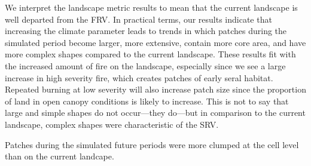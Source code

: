 \documentclass[12pt]{article}
\begin{document}
\begin{spacing}{1}
We interpret the landscape metric results to mean that the current landscape is well departed from the FRV. In practical terms, our results indicate that increasing the climate parameter leads to trends in which patches during the simulated period become larger, more extensive, contain more core area, and have more complex shapes compared to the current landscape. These results fit with the increased amount of fire on the landscape, especially since we see a large increase in high severity fire, which creates patches of early seral habitat. Repeated burning at low severity will also increase patch size since the proportion of land in open canopy conditions is likely to increase. This is not to say that large and simple shapes do not occur---they do---but in comparison to the current landscape, complex shapes were characteristic of the SRV.

Patches during the simulated future periods were more clumped at the cell level than on the current landcape. 




\end{spacing}
\end{document}
